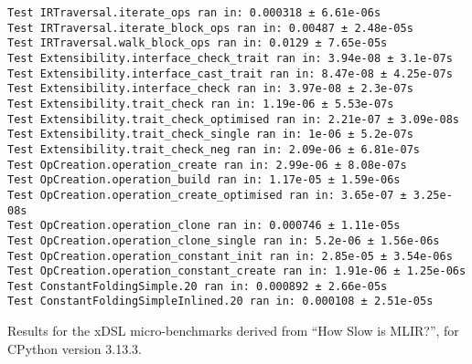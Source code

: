 \begin{code}
    \begin{verbatim}
Test IRTraversal.iterate_ops ran in: 0.000318 ± 6.61e-06s
Test IRTraversal.iterate_block_ops ran in: 0.00487 ± 2.48e-05s
Test IRTraversal.walk_block_ops ran in: 0.0129 ± 7.65e-05s
Test Extensibility.interface_check_trait ran in: 3.94e-08 ± 3.1e-07s
Test Extensibility.interface_cast_trait ran in: 8.47e-08 ± 4.25e-07s
Test Extensibility.interface_check ran in: 3.97e-08 ± 2.3e-07s
Test Extensibility.trait_check ran in: 1.19e-06 ± 5.53e-07s
Test Extensibility.trait_check_optimised ran in: 2.21e-07 ± 3.09e-08s
Test Extensibility.trait_check_single ran in: 1e-06 ± 5.2e-07s
Test Extensibility.trait_check_neg ran in: 2.09e-06 ± 6.81e-07s
Test OpCreation.operation_create ran in: 2.99e-06 ± 8.08e-07s
Test OpCreation.operation_build ran in: 1.17e-05 ± 1.59e-06s
Test OpCreation.operation_create_optimised ran in: 3.65e-07 ± 3.25e-08s
Test OpCreation.operation_clone ran in: 0.000746 ± 1.11e-05s
Test OpCreation.operation_clone_single ran in: 5.2e-06 ± 1.56e-06s
Test OpCreation.operation_constant_init ran in: 2.85e-05 ± 3.54e-06s
Test OpCreation.operation_constant_create ran in: 1.91e-06 ± 1.25e-06s
Test ConstantFoldingSimple.20 ran in: 0.000892 ± 2.66e-05s
Test ConstantFoldingSimpleInlined.20 ran in: 0.000108 ± 2.51e-05s
    \end{verbatim}
    \caption{Results for the xDSL micro-benchmarks derived from ``How Slow is MLIR?'', for CPython version 3.13.3.}
    \label{listing:how-slow-is-mlir-xdsl-microbenchmark-results-313}
\end{code}



